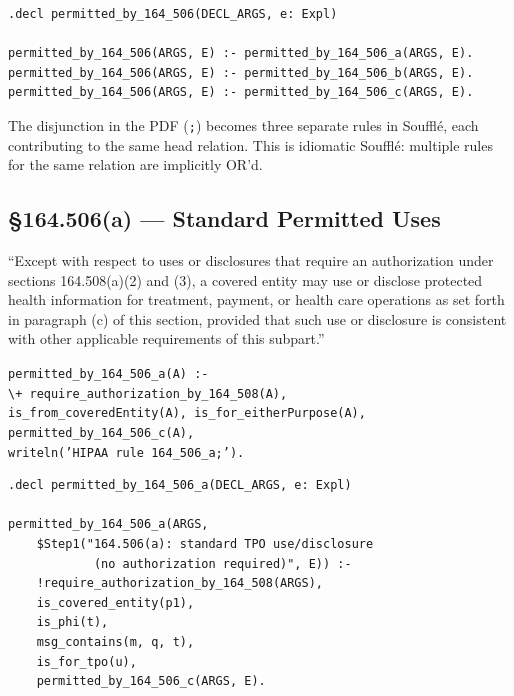 \documentclass[11pt,letterpaper]{article}
\begin{document}
\begin{lstlisting}[style=soufflestyle,caption={\S 164.506 top-level}]
.decl permitted_by_164_506(DECL_ARGS, e: Expl)

permitted_by_164_506(ARGS, E) :- permitted_by_164_506_a(ARGS, E).
permitted_by_164_506(ARGS, E) :- permitted_by_164_506_b(ARGS, E).
permitted_by_164_506(ARGS, E) :- permitted_by_164_506_c(ARGS, E).
\end{lstlisting}

The disjunction in the PDF (\texttt{;}) becomes three separate rules in Souffl\'{e}, each contributing to the same head relation. This is idiomatic Souffl\'{e}: multiple rules for the same relation are implicitly OR'd.

\subsection{\S 164.506(a) --- Standard Permitted Uses}
\label{sec:506a}

\begin{hipaabox}
``Except with respect to uses or disclosures that require an authorization under sections 164.508(a)(2) and (3), a covered entity may use or disclose protected health information for treatment, payment, or health care operations as set forth in paragraph (c) of this section, provided that such use or disclosure is consistent with other applicable requirements of this subpart.''
\end{hipaabox}

\begin{pdfbox}
\texttt{permitted\_by\_164\_506\_a(A) :- }\\
\texttt{\hspace{2em}\textbackslash+ require\_authorization\_by\_164\_508(A),}\\
\texttt{\hspace{2em}is\_from\_coveredEntity(A), is\_for\_eitherPurpose(A),}\\
\texttt{\hspace{2em}permitted\_by\_164\_506\_c(A),}\\
\texttt{\hspace{2em}writeln('HIPAA rule 164\_506\_a;').}
\end{pdfbox}

\begin{lstlisting}[style=soufflestyle,caption={\S 164.506(a) --- Souffl\'{e} translation}]
.decl permitted_by_164_506_a(DECL_ARGS, e: Expl)

permitted_by_164_506_a(ARGS,
    $Step1("164.506(a): standard TPO use/disclosure
            (no authorization required)", E)) :-
    !require_authorization_by_164_508(ARGS),
    is_covered_entity(p1),
    is_phi(t),
    msg_contains(m, q, t),
    is_for_tpo(u),
    permitted_by_164_506_c(ARGS, E).
\end{lstlisting}
\end{document}
